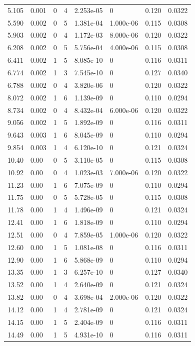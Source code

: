 \documentclass[preview]{standalone}
\begin{document}
{{\begin{tabular}{L{1.2cm}C{1.2cm} C{0.3cm}C{0.5cm} C{1.4cm}C{1.4cm} C{1.4cm}C{1.4cm}}
  5.105  &  0.001  & 0     &  4 &  2.253e-05  & 0  & 0.120 &  0.0322   \\ 
  5.590  &  0.002  & 0     &  5 &  1.381e-04  & 1.000e-06  & 0.115 &  0.0308   \\ 
  5.903  &  0.002  & 0     &  4 &  1.172e-03  & 8.000e-06  & 0.120 &  0.0322   \\ 
  6.208  &  0.002  & 0     &  5 &  5.756e-04  & 4.000e-06  & 0.115 &  0.0308   \\ 
  6.411  &  0.002  & 1     &  5 &  8.085e-10  & 0  & 0.116 &  0.0311   \\ 
  6.774  &  0.002  & 1     &  3 &  7.545e-10  & 0  & 0.127 &  0.0340   \\ 
  6.788  &  0.002  & 0     &  4 &  3.820e-06  & 0  & 0.120 &  0.0322   \\ 
  8.072  &  0.002  & 1     &  6 &  1.139e-09  & 0  & 0.110 &  0.0294   \\ 
  8.734  &  0.002  & 0     &  4 &  8.432e-04  & 6.000e-06  & 0.120 &  0.0322   \\ 
  9.056  &  0.002  & 1     &  5 &  1.892e-09  & 0  & 0.116 &  0.0311   \\ 
  9.643  &  0.003  & 1     &  6 &  8.045e-09  & 0  & 0.110 &  0.0294   \\ 
  9.854  &  0.003  & 1     &  4 &  6.120e-10  & 0  & 0.121 &  0.0324   \\ 
  10.40  &  0.00  & 0     &  5 &  3.110e-05  & 0  & 0.115 &  0.0308   \\ 
  10.92  &  0.00  & 0     &  4 &  1.023e-03  & 7.000e-06  & 0.120 &  0.0322   \\ 
  11.23  &  0.00  & 1     &  6 &  7.075e-09  & 0  & 0.110 &  0.0294   \\ 
  11.75  &  0.00  & 0     &  5 &  5.728e-05  & 0  & 0.115 &  0.0308   \\ 
  11.78  &  0.00  & 1     &  4 &  1.496e-09  & 0  & 0.121 &  0.0324   \\ 
  12.41  &  0.00  & 1     &  6 &  1.818e-09  & 0  & 0.110 &  0.0294   \\ 
  12.51  &  0.00  & 0     &  4 &  7.859e-05  & 1.000e-06  & 0.120 &  0.0322   \\ 
  12.60  &  0.00  & 1     &  5 &  1.081e-08  & 0  & 0.116 &  0.0311   \\ 
  12.90  &  0.00  & 1     &  6 &  5.868e-09  & 0  & 0.110 &  0.0294   \\ 
  13.35  &  0.00  & 1     &  3 &  6.257e-10  & 0  & 0.127 &  0.0340   \\ 
  13.52  &  0.00  & 1     &  4 &  2.640e-09  & 0  & 0.121 &  0.0324   \\ 
  13.82  &  0.00  & 0     &  4 &  3.698e-04  & 2.000e-06  & 0.120 &  0.0322   \\ 
  14.12  &  0.00  & 1     &  4 &  2.781e-09  & 0  & 0.121 &  0.0324   \\ 
  14.15  &  0.00  & 1     &  5 &  2.404e-09  & 0  & 0.116 &  0.0311   \\ 
  14.49  &  0.00  & 1     &  5 &  4.931e-10  & 0  & 0.116 &  0.0311   \\ 
\hline 
\end{tabular} 

}}
\end{document}
